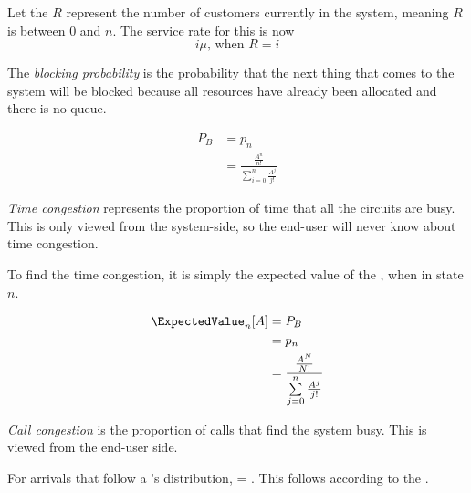 Let the  $R$ represent the number of customers currently in the system, meaning $R$ is between $0$ and $n$.
The service rate for this is now
\begin{equation*}
  i \mu \text{, when } R = i
\end{equation*}

\begin{definition}\label{def:Blocking_Probability-Circuit}
  The \emph{blocking probability} is the probability that the next thing that comes to the system will be blocked because all resources have already been allocated and there is no queue.

  \begin{equation}\label{eq:Blocking_Probability-Circuit}
    \begin{aligned}
      P_{B} &= p_{n} \\
      &= \frac{\frac{A^{n}}{n!}}{\sum\limits_{i=0}^{n} \frac{A^{j}}{j!}}
    \end{aligned}
  \end{equation}
\end{definition}

\begin{definition}\label{def:Time_Congestion}
  \emph{Time congestion} represents the proportion of time that all the circuits are busy.
  This is only viewed from the system-side, so the end-user will never know about time congestion.

  To find the time congestion, it is simply the expected value of the , when in state $n$.

  \begin{equation}\label{eq:Time_Congestion}
    \begin{aligned}
      \ExpectedValue_{n}[A] &= P_{B} \\
      &= p_{n} \\
      &= \frac{\frac{A^{N}}{N!}}{\sum\limits_{j=0}^{n}\frac{A^{j}}{j!}}
    \end{aligned}
  \end{equation}
\end{definition}

\begin{definition}\label{def:Call_Congestion}
  \emph{Call congestion} is the proportion of calls that find the system busy.
  This is viewed from the end-user side.
\end{definition}

\begin{remark*}
  For arrivals that follow a 's distribution,  = .
  This follows according to the .
\end{remark*}

\begin{theorem}\label{thm:PASTA_Theorem}
  
\end{theorem}

